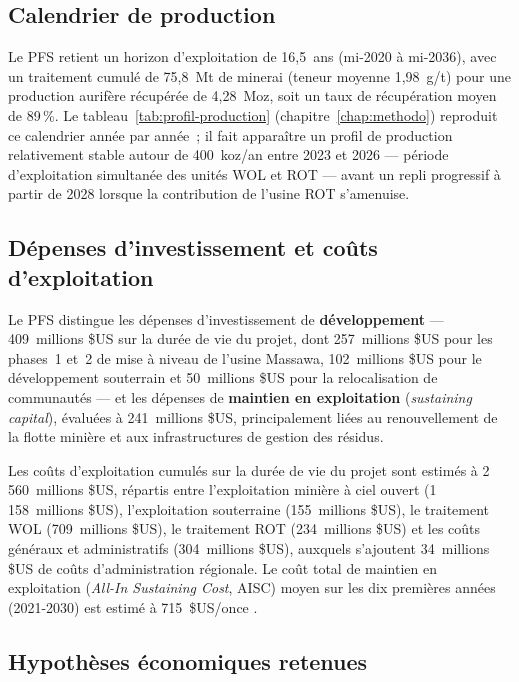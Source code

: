\subsection{Calendrier de production}

Le PFS retient un horizon d'exploitation de 16,5~ans (mi-2020 à mi-2036), avec un traitement cumulé de 75,8~Mt de minerai (teneur moyenne 1,98~g/t) pour une production aurifère récupérée de 4,28~Moz, soit un taux de récupération moyen de 89\,\%. Le tableau~\ref{tab:profil-production} (chapitre~\ref{chap:methodo}) reproduit ce calendrier année par année~; il fait apparaître un profil de production relativement stable autour de 400~koz/an entre 2023 et 2026 --- période d'exploitation simultanée des unités WOL et ROT --- avant un repli progressif à partir de 2028 lorsque la contribution de l'usine ROT s'amenuise.

\subsection{Dépenses d'investissement et coûts d'exploitation}

Le PFS distingue les dépenses d'investissement de \textbf{développement} --- 409~millions \$US sur la durée de vie du projet, dont 257~millions \$US pour les phases~1 et~2 de mise à niveau de l'usine Massawa, 102~millions \$US pour le développement souterrain et 50~millions \$US pour la relocalisation de communautés --- et les dépenses de \textbf{maintien en exploitation} (\emph{sustaining capital}), évaluées à 241~millions \$US, principalement liées au renouvellement de la flotte minière et aux infrastructures de gestion des résidus.

Les coûts d'exploitation cumulés sur la durée de vie du projet sont estimés à 2\,560~millions \$US, répartis entre l'exploitation minière à ciel ouvert (1\,158~millions \$US), l'exploitation souterraine (155~millions \$US), le traitement WOL (709~millions \$US), le traitement ROT (234~millions \$US) et les coûts généraux et administratifs (304~millions \$US), auxquels s'ajoutent 34~millions \$US de coûts d'administration régionale. Le coût total de maintien en exploitation (\emph{All-In Sustaining Cost}, AISC) moyen sur les dix premières années (2021-2030) est estimé à 715~\$US/once \citep{lycopodium2020pfs}.

\subsection{Hypothèses économiques retenues}

